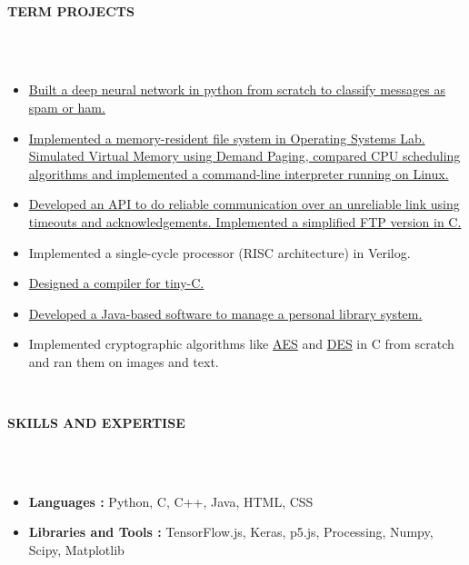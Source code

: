 \documentclass[letter,10pt]{book}
\newcommand{\lsep}{-0.5cm}
\newcommand{\psep}{-0.6cm}
\newcommand{\resheading}[1]{{\small \colorbox{mygrey}{\begin{minipage}{0.975\textwidth}{\textbf{#1 \vphantom{p\^{E}}}}\end{minipage}}}}
\begin{document}
\hspace{0.5cm}\\[-0.2cm]
\resheading{\textbf{TERM PROJECTS} }\\[\lsep]
\\[-1em]
\begin{itemize}
	\item \href{https://github.com/thunderInfy/Spam-Classifier}{Built a deep neural network in python from scratch to classify messages as spam or ham.}\\[\psep]
	\item \href{https://github.com/thunderInfy/Operating-Systems-Lab-IIT-KGP}{Implemented a memory-resident file system in Operating Systems Lab. Simulated Virtual Memory using Demand Paging, compared CPU scheduling algorithms and implemented a command-line interpreter running on Linux.} \\[\psep]
	\item \href{https://github.com/thunderInfy/Networks-Lab-IIT-KGP}{Developed an API to do reliable communication over an unreliable link using timeouts and acknowledgements. Implemented a simplified FTP version in C.}\\[-2em]
	\item Implemented a single-cycle processor (RISC architecture) in Verilog.\\[\psep]
	\item \href{https://github.com/thunderInfy/compiler-for-tiny-C}{Designed a compiler for tiny-C.}\\[\psep]
	\item \href{https://github.com/thunderInfy/Personal-Library-System-software}{Developed a Java-based software to manage a personal library system.}\\[\psep]
	\item Implemented cryptographic algorithms like \href{https://github.com/thunderInfy/AES-one-round}{AES} and \href{https://github.com/thunderInfy/DES-on-image}{DES} in C from scratch and ran them on images and text.
\end{itemize}
\hspace{0.5cm}\\[-0.2cm]
\resheading{\textbf{SKILLS AND EXPERTISE} }\\[\lsep]
\\[-1em]
\begin{itemize}
\item \textbf{Languages :} Python, C, C++, Java, HTML, CSS\\[\psep]
\item \textbf{Libraries and Tools :} TensorFlow.js, Keras, p5.js, Processing, Numpy, Scipy, Matplotlib
\end{itemize}
\end{document}
